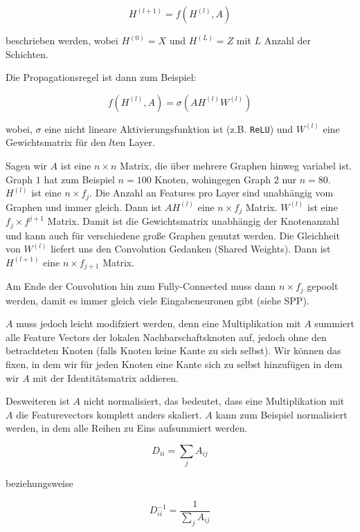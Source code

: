 \documentclass{scrartcl}
\begin{document}
\begin{equation}
  H^{(l+1)} = f(H^{(l)}, A)
\end{equation}

beschrieben werden, wobei $H^{(0)} = X$ und $H^{(L)} = Z$ mit $L$ Anzahl der Schichten.

Die Propagationsregel ist dann zum Beispiel:

\begin{equation}
  f(H^{(l)}, A) = \sigma(AH^{(l)}W^{(l)})
\end{equation}

wobei, $\sigma$ eine nicht lineare Aktivierungsfunktion ist (z.B. \texttt{ReLU}) und $W^{(l)}$ eine Gewichtsmatrix für den $l$ten Layer.

Sagen wir $A$ ist eine $n \times n$ Matrix, die über mehrere Graphen hinweg variabel ist.
Graph $1$ hat zum Beispiel $n = 100$ Knoten, wohingegen Graph $2$ nur $n = 80$.
$H^{(l)}$ ist eine $n \times f_j$.
Die Anzahl an Features pro Layer sind unabhängig vom Graphen und immer gleich.
Dann ist $AH^{(l)}$ eine $n \times f_j$ Matrix.
$W^{(l)}$ ist eine $f_{j} \times f^{j+1}$ Matrix.
Damit ist die Gewichtsmatrix unabhängig der Knotenanzahl und kann auch für verschiedene große Graphen genutzt werden.
Die Gleichheit von $W^{(l)}$ liefert uns den Convolution Gedanken (Shared Weights).
Dann ist $H^{(l+1)}$ eine $n \times f_{j+1}$ Matrix.

Am Ende der Convolution hin zum Fully-Connected muss dann $n \times f_{j}$ gepoolt werden, damit es immer gleich viele Eingabeneuronen gibt (siehe SPP).

$A$ muss jedoch leicht modifziert werden, denn eine Multiplikation mit $A$ summiert alle Feature Vectors der lokalen Nachbarschaftsknoten auf, jedoch ohne den betrachteten Knoten (falls Knoten keine Kante zu sich selbst).
Wir können das fixen, in dem wir für jeden Knoten eine Kante sich zu selbst hinzufügen in dem wir $A$ mit der Identitätsmatrix addieren.

Desweiteren ist $A$ nicht normalisiert, das bedeutet, dass eine Multiplikation mit $A$ die Featurevectors komplett anders skaliert.
$A$ kann zum Beispiel normalisiert werden, in dem alle Reihen zu Eins aufsummiert werden.

\begin{equation}
  D_{ii} = \sum_j A_{ij}
\end{equation}

beziehungsweise

\begin{equation}
  D^{-1}_{ii} = \frac{1}{\sum_j A_{ij}}
\end{equation}
\end{document}

